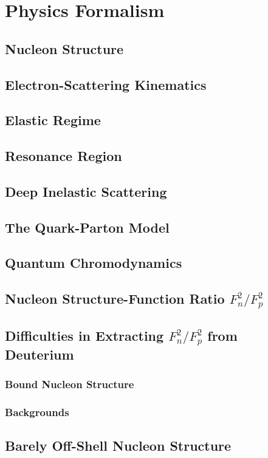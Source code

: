 \chapter{Physics Formalism}
\label{ch:physrev}

\section{Nucleon Structure}
\section{Electron-Scattering Kinematics}
\section{Elastic Regime}
\section{Resonance Region}
\section{Deep Inelastic Scattering}
\section{The Quark-Parton Model}
\section{Quantum Chromodynamics}
\section{Nucleon Structure-Function Ratio $F^2_n/F^2_p$}
\section{Difficulties in Extracting $F^2_n/F^2_p$ from Deuterium}
\subsection{Bound Nucleon Structure}
\subsection{Backgrounds}
\section{Barely Off-Shell Nucleon Structure}
